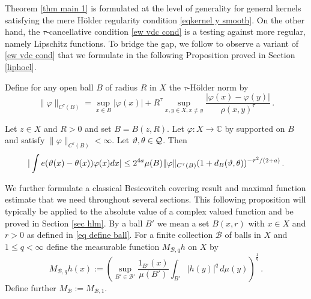 Theorem \ref{thm main 1} is formulated at the level of generality
for general kernels satisfying the mere H\"older regularity condition \eqref{eqkernel y smooth}. On the other hand, the $\tau$-cancellative condition \eqref{ew vdc cond} is a testing against more regular,
namely Lipschitz functions. To bridge the gap, we follow \cite{zk-polynomial} to observe a variant of \eqref{ew vdc cond} that we formulate
in the following Proposition proved in Section \ref{liphoel}.


Define for any open ball $B$ of radius $R$ in $X$ the $\tau$-H\"older norm by
$$
    \|\varphi\|_{C^\tau(B)} = \sup_{x \in B} |\varphi(x)| + R^\tau \sup_{x,y \in X, x \neq y} \frac{|\varphi(x) - \varphi(y)|}{\rho(x,y)^\tau}\,.
$$
\begin{prop}
    \label{lem vdc regularity}
        Let $z\in X$ and $R>0$ and set $B=B(z,R)$.
        Let $\varphi: X \to \mathbb{C}$ by
        supported on $B$ and satisfy $\|{\varphi}\|_{C^\tau(B)}<\infty$.
        Let $\vartheta, \theta \in \mathcal{Q}$. Then
    \begin{equation}
        \label{eq vdc cond tau 2}
        |\int e(\vartheta(x)-{\theta(x)})\varphi(x) dx|\le
            2^{4a} \mu(B) \|{\varphi}\|_{C^\tau(B)}
        (1 + d_{B}(\vartheta,\theta))^{-\tau^2/(2+a)}
    \,.
    \end{equation}
    \end{prop}

We further formulate a classical Besicovitch covering result
and maximal function estimate that we need throughout several sections.
This following proposition will typically be applied to the absolute value of a complex valued function and be proved in Section \ref{sec hlm}. By a ball $B'$ we mean a set $B(x,r)$ with $x\in X$
and $r>0$ as defined in \eqref{eq define ball}.
For a finite collection $\mathcal{B}$ of balls in $X$
and $1\le q< \infty$  define the measurable function $M_{\mathcal{B},q}h$ on $X$ by
\begin{equation}\label{def hlm}
M_{\mathcal{B},q}h(x):=\left(\sup_{B'\in \mathcal{B'}} \frac{1_{B'}(x)}{\mu(B')}\int _{B'} |h(y)|^q\, d\mu(y)\right)^\frac 1q\,  .
\end{equation}
Define further $M_{\mathcal{B}}:=M_{\mathcal{B},1}$.

